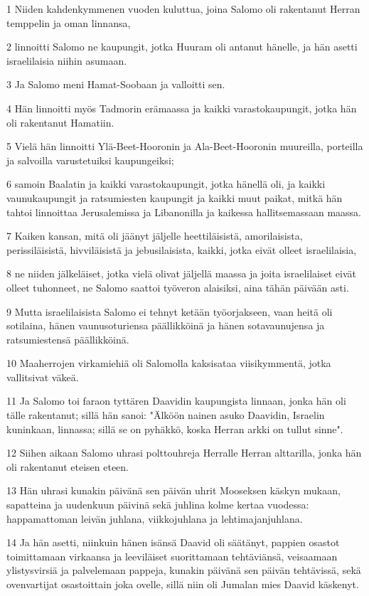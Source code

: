 \par 1 Niiden kahdenkymmenen vuoden kuluttua, joina Salomo oli rakentanut Herran temppelin ja oman linnansa,
\par 2 linnoitti Salomo ne kaupungit, jotka Huuram oli antanut hänelle, ja hän asetti israelilaisia niihin asumaan.
\par 3 Ja Salomo meni Hamat-Soobaan ja valloitti sen.
\par 4 Hän linnoitti myös Tadmorin erämaassa ja kaikki varastokaupungit, jotka hän oli rakentanut Hamatiin.
\par 5 Vielä hän linnoitti Ylä-Beet-Hooronin ja Ala-Beet-Hooronin muureilla, porteilla ja salvoilla varustetuiksi kaupungeiksi;
\par 6 samoin Baalatin ja kaikki varastokaupungit, jotka hänellä oli, ja kaikki vaunukaupungit ja ratsumiesten kaupungit ja kaikki muut paikat, mitkä hän tahtoi linnoittaa Jerusalemissa ja Libanonilla ja kaikessa hallitsemassaan maassa.
\par 7 Kaiken kansan, mitä oli jäänyt jäljelle heettiläisistä, amorilaisista, perissiläisistä, hivviläisistä ja jebusilaisista, kaikki, jotka eivät olleet israelilaisia,
\par 8 ne niiden jälkeläiset, jotka vielä olivat jäljellä maassa ja joita israelilaiset eivät olleet tuhonneet, ne Salomo saattoi työveron alaisiksi, aina tähän päivään asti.
\par 9 Mutta israelilaisista Salomo ei tehnyt ketään työorjakseen, vaan heitä oli sotilaina, hänen vaunusoturiensa päällikköinä ja hänen sotavaunujensa ja ratsumiestensä päällikköinä.
\par 10 Maaherrojen virkamiehiä oli Salomolla kaksisataa viisikymmentä, jotka vallitsivat väkeä.
\par 11 Ja Salomo toi faraon tyttären Daavidin kaupungista linnaan, jonka hän oli tälle rakentanut; sillä hän sanoi: "Älköön nainen asuko Daavidin, Israelin kuninkaan, linnassa; sillä se on pyhäkkö, koska Herran arkki on tullut sinne".
\par 12 Siihen aikaan Salomo uhrasi polttouhreja Herralle Herran alttarilla, jonka hän oli rakentanut eteisen eteen.
\par 13 Hän uhrasi kunakin päivänä sen päivän uhrit Mooseksen käskyn mukaan, sapatteina ja uudenkuun päivinä sekä juhlina kolme kertaa vuodessa: happamattoman leivän juhlana, viikkojuhlana ja lehtimajanjuhlana.
\par 14 Ja hän asetti, niinkuin hänen isänsä Daavid oli säätänyt, pappien osastot toimittamaan virkaansa ja leeviläiset suorittamaan tehtäviänsä, veisaamaan ylistysvirsiä ja palvelemaan pappeja, kunakin päivänä sen päivän tehtävissä, sekä ovenvartijat osastoittain joka ovelle, sillä niin oli Jumalan mies Daavid käskenyt.
